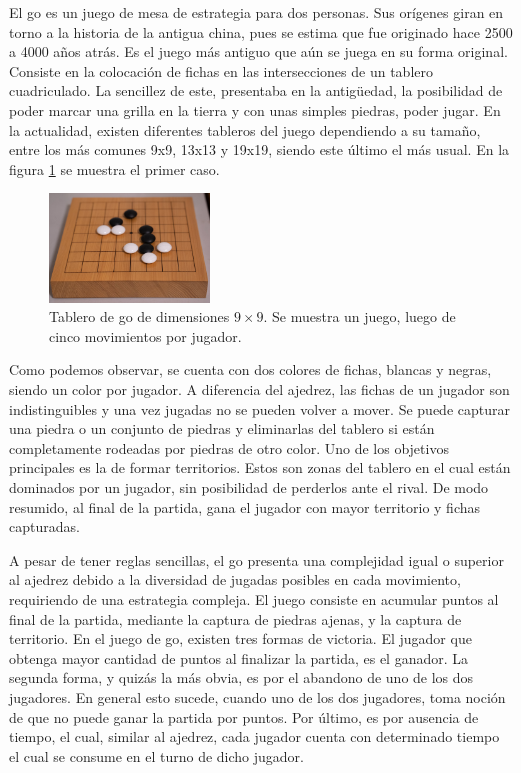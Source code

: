 \documentclass[11pt,twoside,spanish]{report} %
\begin{document}
El go es un juego de mesa de estrategia para dos personas.
Sus or\'igenes giran en torno a la historia de la antigua china, pues se estima que fue originado hace 2500 a 4000 a\~nos atr\'as.
Es el juego m\'as antiguo que a\'un se juega en su forma original.
Consiste en la colocaci\'on de fichas en las intersecciones de un tablero cuadriculado. %
La sencillez de este, presentaba  en la antig\"uedad, la posibilidad de poder marcar una grilla en la tierra y con unas simples piedras, poder jugar.
En la actualidad, existen diferentes tableros del juego dependiendo a su tama\~no, entre los m\'as comunes 9x9, 13x13 y 19x19, siendo este \'ultimo el m\'as usual. En la figura \ref{fig:tablero} se muestra el primer caso.

\begin{figure} %
	\includegraphics[width=0.38\textwidth]{../tablero.jpg}
	\caption{Tablero de go de dimensiones $9\times9$. Se muestra un juego, luego de cinco movimientos por jugador.}
	\label{fig:tablero}
\end{figure}

Como podemos observar, se cuenta con dos colores de fichas, blancas y negras, siendo un color por jugador.
A diferencia del ajedrez, las fichas de un jugador son indistinguibles y una vez jugadas no se pueden volver a mover.
Se puede capturar una piedra o un conjunto de piedras y eliminarlas del tablero si est\'an completamente rodeadas por piedras de otro color.
Uno de los objetivos principales es la de formar territorios.
Estos son zonas del tablero en el cual est\'an dominados por un jugador, sin posibilidad de perderlos ante el rival.
De modo resumido, al final de la partida, gana el jugador con mayor territorio y fichas capturadas.



A pesar de tener reglas sencillas, el go presenta una complejidad igual o superior al ajedrez debido a la diversidad de jugadas posibles en cada movimiento, requiriendo de una estrategia compleja. %
El juego consiste en acumular puntos al final de la partida, mediante la captura de piedras ajenas, y la captura de territorio.
En el juego de go, existen tres formas de victoria.
El jugador que obtenga mayor cantidad de puntos al finalizar la partida, es el ganador.
La segunda forma, y quiz\'as la m\'as obvia, es por el abandono de uno de los dos jugadores.
En general esto sucede, cuando uno de los dos jugadores, toma noci\'on de que no puede ganar la partida por puntos.
Por \'ultimo, es por ausencia de tiempo, el cual, similar al ajedrez, cada jugador cuenta con determinado tiempo el cual se consume en el turno de dicho jugador.
\end{document}
